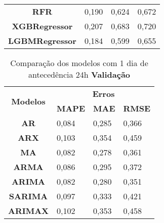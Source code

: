 \begin{table}[H]
\begin{tabular}{@{}clll@{}}
\textbf{RFR}                      & 0,190                             & 0,624                            & 0,672                             \\
\textbf{XGBRegressor}             & 0,207                             & 0,683                            & 0,720                             \\
\textbf{LGBMRegressor}            & 0,184                             & 0,599                            & 0,655                             \\ \bottomrule
	\end{tabular}

\end{table}

\begin{table}[H]
	\centering
	\caption{Comparação dos modelos com 1 dia de antecedência 24h \textbf{Validação} }\label{tb:1-24vld}
	\begin{tabular}{@{}clll@{}}
		\toprule
		\multirow{2}{*}{\textbf{Modelos}} & \multicolumn{3}{c}{\textbf{Erros}}                                                                       \\ \cmidrule(l){2-4} 
		& \multicolumn{1}{c}{\textbf{MAPE}} & \multicolumn{1}{c}{\textbf{MAE}} & \multicolumn{1}{c}{\textbf{RMSE}} \\ \hline
\textbf{AR}                       & 0,084                             & 0,285                            & 0,366                             \\
\textbf{ARX}                      & 0,103                             & 0,354                            & 0,459                             \\
\textbf{MA}                       & 0,082                             & 0,278                            & 0,361                             \\
\textbf{ARMA}                     & 0,086                             & 0,295                            & 0,372                             \\
\textbf{ARIMA}                    & 0,082                             & 0,280                            & 0,351                             \\
\textbf{SARIMA}                   & 0,097                             & 0,333                            & 0,421                             \\
\textbf{ARIMAX}                   & 0,102                             & 0,353                            & 0,458                             \\

\end{tabular}
\end{table}
